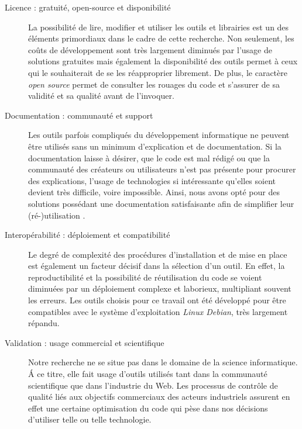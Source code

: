     \begin{description}
        \item[Licence : gratuité, open-source et disponibilité]
            La possibilité de lire, modifier et utiliser les outils et librairies est un des éléments primordiaux dans le cadre de cette recherche. Non seulement, les coûts de développement sont très largement diminués par l'usage de solutions gratuites mais également la disponibilité des outils permet à ceux qui le souhaiterait de se les réapproprier librement. De plus, le caractère \textit{open source} permet de consulter les rouages du code et s'assurer de sa validité et sa qualité avant de l'invoquer.

        \item[Documentation : communauté et support]
            Les outils parfois compliqués du développement informatique ne peuvent être utilisés sans un minimum d'explication et de documentation. Si la documentation laisse à désirer, que le code est mal rédigé ou que la communauté des créateurs ou utilisateurs n'est pas présente pour procurer des explications, l'usage de technologies si intéressante qu'elles soient devient très difficile, voire impossible. Ainsi, nous avons opté pour des solutions possédant une documentation satisfaisante afin de simplifier leur (ré-)utilisation .

        \item[Interopérabilité : déploiement et compatibilité]
            Le degré de complexité des procédures d'installation et de mise en place est également un facteur décisif dans la sélection d'un outil. En effet, la reproductibilité et la possibilité de réutilisation du code se voient diminuées par un déploiement complexe et laborieux, multipliant souvent les erreurs. Les outils choisis pour ce travail ont été développé pour être compatibles avec le système d'exploitation \textit{Linux Debian}, très largement répandu.

        \item[Validation : usage commercial et scientifique]
            Notre recherche ne se situe pas dans le domaine de la science informatique. \'A ce titre, elle fait usage d'outils utilisés tant dans la communauté scientifique que dans l'industrie du Web. Les processus de contrôle de qualité liés aux objectifs commerciaux des acteurs industriels assurent en effet une certaine optimisation du code qui pèse dans nos décisions d'utiliser telle ou telle technologie.
    \end{description}

